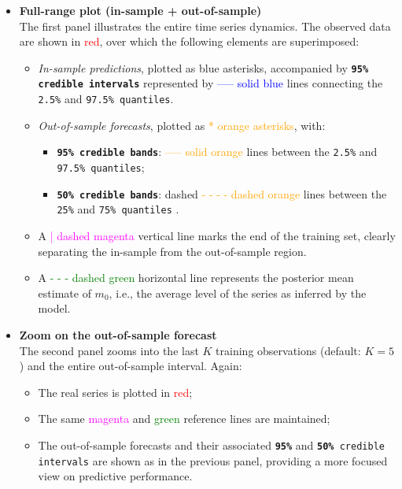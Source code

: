 \documentclass{Configuration_Files/PoliMi3i_thesis}
\begin{document}
\begin{itemize}
  \item \textbf{Full-range plot (in-sample + out-of-sample)}\\
  The first panel illustrates the entire time series dynamics. The observed data are shown in \textcolor{red}{red}, over which the following elements are superimposed:
  \begin{itemize}
    \item \textit{In-sample predictions}, plotted as blue asterisks, accompanied by \texttt{\textbf{95\% credible intervals}} represented by \textcolor{blue}{----- solid blue} lines connecting the \texttt{2.5\%} and \texttt{97.5\% quantiles}.
    \item \textit{Out-of-sample forecasts}, plotted as \textcolor{orange}{* orange asterisks}, with:
    \begin{itemize}
      \item \texttt{\textbf{95\% credible bands}}: \textcolor{orange}{----- solid orange} lines between the \texttt{2.5\%} and \texttt{97.5\% quantiles};
      \item \texttt{\textbf{50\% credible bands}}: dashed \textcolor{orange}{- - - - dashed orange} lines between the \texttt{25\%} and \texttt{75\% quantiles} .
    \end{itemize}
    \item A \textcolor{magenta}{| dashed magenta} vertical line marks the end of the training set, clearly separating the in-sample from the out-of-sample region.
    \item A \textcolor{green}{- - - dashed green} horizontal line represents the posterior mean estimate of $m_0$, i.e., the average level of the series as inferred by the model.
  \end{itemize}

  \item \textbf{Zoom on the out-of-sample forecast}\\
  The second panel zooms into the last $K$ training observations (default: $K=5$) and the entire out-of-sample interval. Again:
  \begin{itemize}
    \item The real series is plotted in \textcolor{red}{red};
    \item The same \textcolor{magenta}{magenta} and \textcolor{green}{green} reference lines are maintained;
    \item The out-of-sample forecasts and their associated \texttt{\textbf{95\%}} and \texttt{\textbf{50\%} credible intervals} are shown as in the previous panel, providing a more focused view on predictive performance.
  \end{itemize}
\end{itemize}
\end{document}
